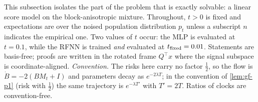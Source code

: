 This subsection isolates the part of the problem that is exactly solvable: a linear score model on the block-anisotropic mixture. Throughout, $t>0$ is fixed and expectations are over the noised population distribution $p_t$ unless a subscript $n$ indicates the empirical one. Two values of $t$ occur: the MLP is evaluated at $t=0.1$, while the RFNN is trained \emph{and} evaluated at $t_{\rm fixed}=0.01$. Statements are basis-free; proofs are written in the rotated frame $Q^{\top}x$ where the signal subspace is coordinate-aligned. \emph{Convention.} The risks here carry no factor $\tfrac12$, so the flow is $\dot B=-2(BM_t+I)$ and parameters decay as $e^{-2\lambda T}$; in the convention of \cref{lem:gf-p1} (risk with $\tfrac12$) the same trajectory is $e^{-\lambda T'}$ with $T'=2T$. Ratios of clocks are convention-free.

